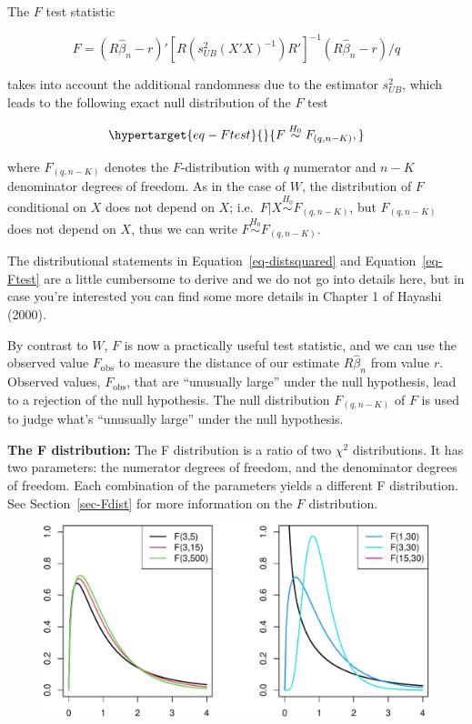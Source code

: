 \documentclass[
  letterpaper,
  DIV=11,
  numbers=noendperiod]{scrreprt}
\theoremstyle{definition}
\theoremstyle{plain}
\theoremstyle{plain}
\theoremstyle{remark}
\begin{document}
The \(F\) test statistic

\[
F=(R\hat\beta_n -r)'[R(s_{UB}^2(X'X)^{-1})R']^{-1}(R\hat\beta_n -r)/q
\]

takes into account the additional randomness due to the estimator
\(s_{UB}^2\), which leads to the following exact null distribution of
the \(F\) test

\begin{equation}\protect\hypertarget{eq-Ftest}{}{
F\overset{H_0}{\sim} F_{(q,n-K)},
}\label{eq-Ftest}\end{equation}

where \(F_{(q,n-K)}\) denotes the \(F\)-distribution with \(q\)
numerator and \(n-K\) denominator degrees of freedom. As in the case of
\(W\), the distribution of \(F\) conditional on \(X\) does not depend on
\(X\); i.e.~\(F|X\overset{H_0}{\sim}F_{(q,n-K)}\), but \(F_{(q,n-K)}\)
does not depend on \(X\), thus we can write
\(F\overset{H_0}{\sim}F_{(q,n-K)}.\)

The distributional statements in Equation~\ref{eq-distsquared} and
Equation~\ref{eq-Ftest} are a little cumbersome to derive and we do not
go into details here, but in case you're interested you can find some
more details in Chapter 1 of Hayashi (2000).

By contrast to \(W\), \(F\) is now a practically useful test statistic,
and we can use the observed value \(F_{\text{obs}}\) to measure the
distance of our estimate \(R\hat\beta_n\) from value \(r\). Observed
values, \(F_{\text{obs}}\), that are ``unusually large'' under the null
hypothesis, lead to a rejection of the null hypothesis. The null
distribution \(F_{(q,n-K)}\) of \(F\) is used to judge what's
``unusually large'' under the null hypothesis.

\textbf{The F distribution:} The F distribution is a ratio of two
\(\chi^2\) distributions. It has two parameters: the numerator degrees
of freedom, and the denominator degrees of freedom. Each combination of
the parameters yields a different F distribution. See
Section~\ref{sec-Fdist} for more information on the \(F\) distribution.

\begin{figure}

{\centering \includegraphics{./05-Small-Sample-Inference_files/figure-pdf/unnamed-chunk-1-1.pdf}

}

\end{figure}
\end{document}
